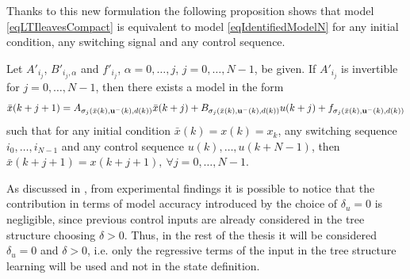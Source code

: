 Thanks to this new formulation the following proposition shows that model \eqref{eqLTIleavesCompact} is equivalent to model \eqref{eqIdentifiedModelN} for any initial condition, any switching signal and any control sequence.
\begin{proposition}\label{propSwitchingSystem}\cite{smarraNAHS2020}
	Let $A'_{i_j}$, $B'_{i_j,\alpha}$ and $f'_{i_j}$, $\alpha=0,\ldots,j$, $j=0,\ldots,N-1$, be given. If $A'_{i_j}$ is invertible for $j=0,\ldots,N-1$, then there exists a model in the form
	\vspace{-0.2cm}
	\small
	\begin{equation*}
	\bar x({k+j+1}) = A_{\sigma_j(\bar x(k),\bold{u^-}(k), d(k))} \bar x({k+j})+B_{\sigma_j(\bar x(k),\bold{u^-}(k), d(k))} u({k+j})+ f_{\sigma_j(\bar x(k),\bold{u^-}(k), d(k))}	
	\end{equation*}
	\normalsize
	such that for any initial condition $\bar x(k) = x(k) = x_k$, any switching sequence $i_0, \ldots, i_{N-1}$ and any control sequence $u(k),\ldots,u(k+N-1)$, then $\bar x(k+j+1) = x(k+j+1),\ \forall j=0,\ldots,N-1$.
\end{proposition}

As discussed in \cite{smarraNAHS2020}, from experimental findings it is possible to notice that the contribution in terms of model accuracy introduced by the choice of $\delta_u = 0$ is negligible, since previous control inputs are already considered in the tree structure choosing $\delta > 0$. Thus, in the rest of the thesis it will be considered $\delta_u = 0$ and $\delta > 0$, i.e. only the regressive terms of the input in the tree structure learning will be used and not in the state definition.

